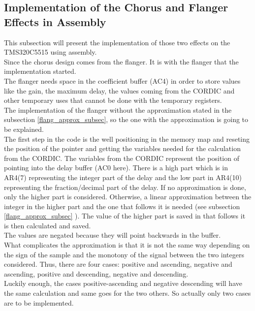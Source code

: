 \subsection{Implementation of the Chorus and Flanger Effects in Assembly}

This subsection will present the implementation of those two effects on the TMS320C5515 using assembly. \\
Since the chorus design comes from the flanger. It is with the flanger that the implementation started. \\
The flanger needs space in the coefficient buffer (AC4) in order to store values like the gain, the maximum delay, the values coming from the CORDIC and other temporary uses that cannot be done with the temporary registers. \\
The implementation of the flanger without the approximation stated in the subsection \ref{flang_approx_subsec}, so the one with the approximation is going to be explained. \\
The first step in the code is the well positioning in the memory map and reseting the position of the pointer and getting the variables needed for the calculation from the CORDIC.
The variables from the CORDIC represent the position of pointing into the delay buffer (AC0 here). There is a high part which is in AR4(7) representing the integer part of the delay and the low part in AR4(10) representing the fraction/decimal part of the delay. If no approximation is done, only the higher part is considered. Otherwise, a linear approximation between the integer in the higher part and the one that follows it is needed (see subsection \ref{flang_approx_subsec} ). 
The value of the higher part is saved in that follows it is then calculated and saved. \\
The values are negated because they will point backwards in the buffer. \\
What complicates the approximation is that it is not the same way depending on the sign of the sample and the monotony of the signal between the two integers considered. Thus, there are four cases: positive and ascending, negative and ascending, positive and descending, negative and descending. \\
Luckily enough, the cases positive-ascending and negative descending will have the same calculation and same goes for the two others. So actually only two cases are to be implemented. \\
